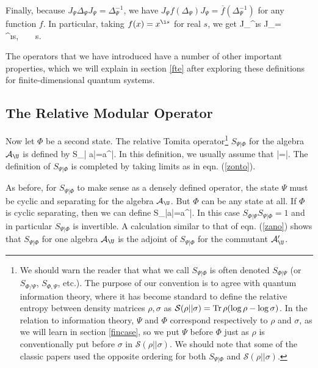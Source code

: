 \documentclass[12pt]{article}
\def\Bbb{\mathbb}
\def\Tr{{\rm Tr}}
\def\a{{\sf a}}
\def\bar{\overline}
\def\ra{\rangle}
\def\la{\langle}
\def\R{{\Bbb{R}}}\def\Z{{\Bbb{Z}}}
\def\S{{\mathcal S}}
\numberwithin{equation}{section}
\def\Z{{\Bbb Z}}
\def\bar{\overline}
\def\A{{\mathcal A}}
\def\bar{\overline}
\begin{document}
Finally, because $J_\Psi \Delta_\Psi J_\Psi =\Delta_\Psi^{-1}$, we have $J_\Psi f(\Delta_\Psi) J_\Psi = \bar f(\Delta_\Psi^{-1})$
for any function $f$.  In particular, taking $f(x)=x^{\i s}$ for real $s$, we get
\be\label{arplor} J_\Psi \Delta^{\i s} J_\Psi = \Delta^{\i s},~~~~s\in\R. \ee

The operators that we have introduced have a number of other important properties, which we will explain in section \ref{fte}
after exploring these definitions for finite-dimensional quantum systems.

\subsection{The Relative Modular Operator}\label{relmod}


Now let $\Phi$ be a second state.   The relative Tomita operator\footnote{We should warn the reader that what we call $S_{\Psi|\Phi}$ is often denoted $S_{\Phi|\Psi}$ (or $S_{\Phi/\Psi}$, $S_{\Phi,\Psi}$,
etc.).   The purpose of our convention is to agree with quantum information theory, where it has become standard to define the relative entropy between density matrices $\rho,\sigma$
as $\S(\rho||\sigma)=\Tr\,\rho (\log \rho-\log\sigma)$.    In the relation to information theory, $\Psi$ and $\Phi$ correspond respectively to $\rho$ and $\sigma$, as we will learn in section
\ref{fincase}, so we put $\Psi$ before $\Phi$ just as $\rho$ is conventionally put before $\sigma$ in  $\S(\rho||\sigma)$.  We should note that some of the classic papers used the opposite
ordering for both $S_{\Psi|\Phi}$ and $\S(\rho||\sigma)$. } $S_{\Psi|\Phi}$ for the algebra $\A_\U$ is defined by
\cite{Araki2}
\be\label{zorf} S_{\Psi|\Phi} \a|\Psi\rangle =\a^\dagger|\Phi\ra. \ee
In this definition, we usually assume that
\be\label{orf}\la\Psi|\Psi\ra =\la\Phi|\Phi\ra=1.\ee
The definition of $S_{\Psi|\Phi}$  is completed by taking limits as in eqn. (\ref{zonto}). 

As before, for  $S_{\Psi|\Phi}$ to make sense as a densely defined operator, the state $\Psi$ must be cyclic and separating
for the algebra $\A_\U$.  But $\Phi$ can be any state at all.  
If $\Phi$ is cyclic separating, then we can define
\be\label{oorf}S_{\Phi|\Psi}\a|\Phi\ra=\a^\dagger |\Psi\ra.\ee
In this case $S_{\Phi|\Psi}S_{\Psi|\Phi}=1$ and in particular $S_{\Psi|\Phi}$ is invertible.    A calculation similar to that of eqn. 
(\ref{zano})  shows  that $S_{\Psi|\Phi}$  for one algebra $\A_\U$ is the adjoint of $S_{\Psi|\Phi}$ for the commutant $\A_\U'$.
\end{document}

